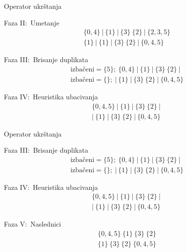 \documentclass[aspectratio=169,xcolor=dvipsnames]{beamer}
\begin{document}
\begin{frame}{Operator ukrštanja}
    \begin{exampleblock}{Faza II:\ Umetanje}
        \[
            \begin{aligned}
                \{0, 4\}\ |\ \{1\}\ |\ \{3\}\ \{2\}\ |\ \{2, 3, 5\} \\
                \{1\}\ |\ \{1\}\ |\ \{3\}\ \{2\}\ |\ \{0, 4, 5\}
            \end{aligned}
        \]
    \end{exampleblock}
    \begin{exampleblock}{Faza III:\ Brisanje duplikata}
        \[
            \begin{aligned}
                \text{izbačeni}= \{ 5\};\ \{0, 4\}\ |\ \{1\}\ |\ \{3\}\ \{2\}\ |\  \\
                \text{izbačeni}= \{\};\ |\ \{1\}\ |\ \{3\}\ \{2\}\ |\ \{0, 4, 5\}  
            \end{aligned}
        \]
    \end{exampleblock}
    \begin{exampleblock}{Faza IV:\ Heuristika ubacivanja}
        \[
            \begin{aligned}
                \{0, 4, 5\}\ |\ \{1\}\ |\ \{3\}\ \{2\}\ |\  \\
                |\ \{1\}\ |\ \{3\}\ \{2\}\ |\ \{0, 4, 5\}  
            \end{aligned}
        \]
    \end{exampleblock}
\end{frame}


\begin{frame}{Operator ukrštanja}
    \begin{exampleblock}{Faza III:\ Brisanje duplikata}
        \[
            \begin{aligned}
                \text{izbačeni}= \{ 5\};\ \{0, 4\}\ |\ \{1\}\ |\ \{3\}\ \{2\}\ |\  \\
                \text{izbačeni}= \{\};\ |\ \{1\}\ |\ \{3\}\ \{2\}\ |\ \{0, 4, 5\}  
            \end{aligned}
        \]
    \end{exampleblock}
    \begin{exampleblock}{Faza IV:\ Heuristika ubacivanja}
        \[
            \begin{aligned}
                \{0, 4, 5\}\ |\ \{1\}\ |\ \{3\}\ \{2\}\ |\  \\
                |\ \{1\}\ |\ \{3\}\ \{2\}\ |\ \{0, 4, 5\}  
            \end{aligned}
        \]
    \end{exampleblock}
    \begin{exampleblock}{Faza V:\ Naslednici}
        \[
            \begin{aligned}
                \{0, 4, 5\}\ \{1\}\ \{3\}\ \{2\}  \\
                \{1\}\ \{3\}\ \{2\}\ \{0, 4, 5\}  
            \end{aligned}
        \]
    \end{exampleblock}
\end{frame}
\end{document}

